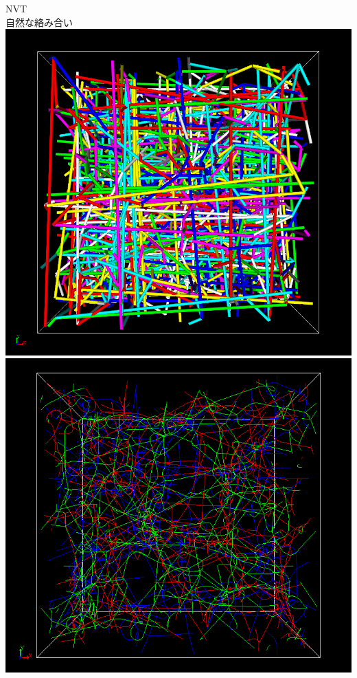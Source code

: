 \documentclass[12pt, dvipdfmx]{beamer}
\begin{document}
\begin{frame}
\begin{columns}[c, onlytextwidth]
    \end{columns}
    \vspace{3mm}
    \begin{columns}[c, onlytextwidth]
        NVT\\
        自然な絡み合い
        \centering
            \includegraphics[width=.8\textwidth]{z_cord_4Chain.png}
        \centering
            \includegraphics[width=.8\textwidth]{N48_f4_PPA.png}
    \end{columns}
\end{frame}
\end{document}

